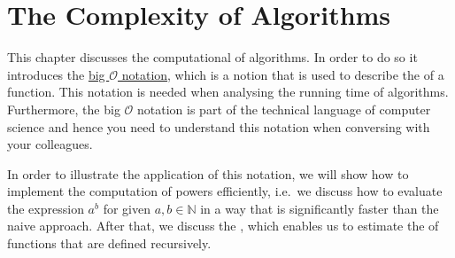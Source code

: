 \chapter{The Complexity of Algorithms} 
This chapter discusses the computational  of algorithms.  In order to do so it introduces the
\href{http://en.wikipedia.org/wiki/O_notation}{big $\mathcal{O}$ notation}, which is a notion that is used to
describe the  of a function.  
This  notation is needed when analysing the running time of algorithms.  Furthermore, the big $\mathcal{O}$
notation is part of the technical language of computer science and hence you need to understand this notation
when conversing with your colleagues.

In order to illustrate the application of this notation, we will show how to implement the computation of
powers efficiently, i.e.~we discuss how to evaluate the expression $a^b$ for given $a,b \in \mathbb{N}$ in a way that
is significantly faster than the naive approach.  After that, we discuss the , which
enables us to estimate the  of functions that are defined recursively.


